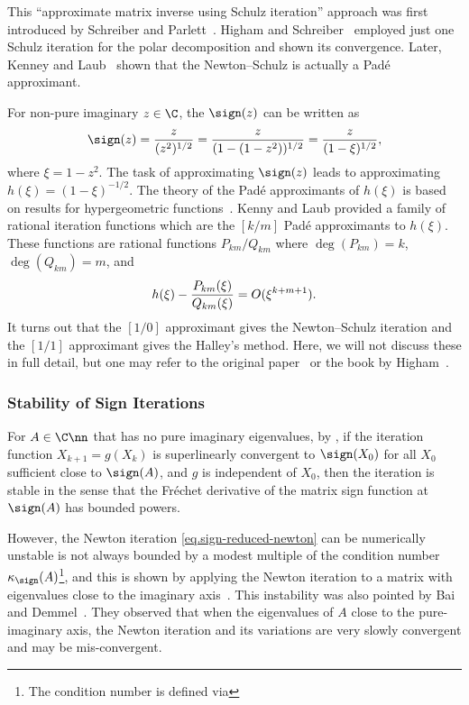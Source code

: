 This ``approximate matrix inverse using Schulz iteration'' approach was
first introduced by Schreiber and Parlett~.
Higham and Schreiber~\cite[1990]{hisc90} employed just one Schulz iteration
for the polar decomposition and shown its convergence. Later, Kenney and
Laub~ shown that the Newton--Schulz is actually a
Pad\'{e} approximant.

For non-pure imaginary $z\in\C$, the $\sign(z)$ can be written as
\begin{equation}\notag
  \sign(z) = \frac{z}{(z^{2})^{1/2}} = \frac{z}{(1-(1-z^{2}))^{1/2}} =
  \frac{z}{(1-\xi)^{1/2}},
\end{equation}
where $\xi = 1-z^{2}$. The task of approximating $\sign(z)$ leads to
approximating $h(\xi) = (1-\xi)^{-1/2}$. The theory of the Pad\'{e}
approximants of $h(\xi)$ is based on results for hypergeometric
functions~. Kenny and Laub provided a
family of rational iteration functions which are the $[k/m]$ Pad\'{e}
approximants to $h(\xi)$. These functions are rational functions
$P_{km}/Q_{km}$ where $\deg(P_{km}) = k$, $\deg(Q_{km}) = m$, and
\begin{equation}\notag
  h(\xi) - \frac{P_{km}(\xi)}{Q_{km}(\xi)} = O(\xi^{k + m + 1}).
\end{equation}
It turns out that the $[1/0]$ approximant gives the Newton--Schulz
iteration and the $[1/1]$ approximant gives the Halley's method. Here, we
will not discuss these in full detail, but one may refer to the original
paper~ or the book by Higham~.

\subsubsection{Stability of Sign Iterations}
For $A\in\C\nn$ that has no pure imaginary eigenvalues, by , if the iteration function $X_{k + 1} = g(X_{k})$ is
superlinearly convergent to $\sign(X_{0})$ for all $X_{0}$ sufficient close
to $\sign(A)$, and $g$ is independent of $X_{0}$, then the iteration is
stable in the sense that the Fr\'echet derivative of the matrix sign
function at $\sign(A)$ has bounded powers.

However, the Newton iteration \eqref{eq.sign-reduced-newton} can be
numerically unstable is not always bounded by a modest multiple of the
condition number $\kappa_{\sign}(A)$\footnote{The condition number is
  defined via }, and this is shown by
applying the Newton iteration to a matrix with eigenvalues close to the
imaginary axis~. This instability was
also pointed by Bai and Demmel~. They observed
that when the eigenvalues of $A$ close to the pure-imaginary axis, the
Newton iteration and its variations are very slowly convergent and may be
mis-convergent.

